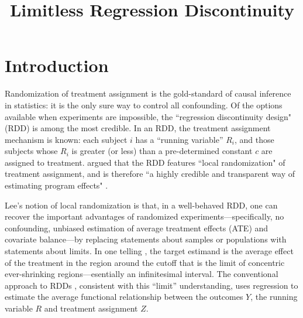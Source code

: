 \documentclass[12pt]{article}
\title{Limitless Regression Discontinuity}
\begin{document}
\maketitle

\section{Introduction}

Randomization of treatment assignment is the gold-standard of causal
inference in statistics: it is the only sure way to control all confounding.
Of the options available when experiments are impossible, the
``regression discontinuity design" (RDD)
\citep{thistlethwaite1960regression,cook2008waiting,imbens2008regression,lee2010regression}
is among the most credible.
In an RDD, the treatment assignment mechanism is known: each subject
$i$ has a ``running variable'' $R_i$, and those subjects whose $R_i$
is greater (or less) than a pre-determined constant $c$ are assigned
to treatment.
\citet{lee2008randomized} argued
that the RDD features ``local randomization" of treatment assignment,
and is therefore ``a highly credible and transparent way of estimating
program effects" \citep[][p. 282] {lee2010regression}.

Lee's notion of local randomization is that, in a well-behaved RDD,
one can recover the important advantages of randomized
experiments---specifically, no confounding, unbiased estimation of
average treatment effects (ATE) and covariate balance---by replacing
statements about samples or populations with statements about limits.
In one telling \citep{imbens2008regression}, the target estimand is the average effect of the treatment in the region around the cutoff that is the limit of concentric ever-shrinking regions---esentially an infinitesimal interval. 
The conventional approach to RDDs
\citep[eg.][]{berk1983capitalizing,angrist1999using,oreopoulos2006estimating}, consistent with this ``limit'' understanding,
uses regression to estimate the average functional
relationship between the outcomes $Y$, the running variable $R$ and
treatment assignment $Z$.
\end{document}

